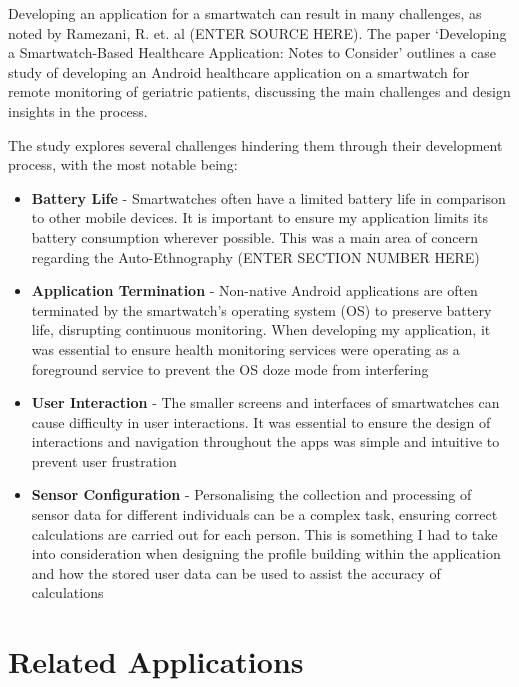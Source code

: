 \documentclass{l4proj}
\begin{document}
Developing an application for a smartwatch can result in many challenges, as noted by Ramezani, R. et. al (ENTER SOURCE HERE). The paper ‘Developing a Smartwatch-Based Healthcare Application: Notes to Consider’ outlines a case study of developing an Android healthcare application on a smartwatch for remote monitoring of geriatric patients, discussing the main challenges and design insights in the process.

The study explores several challenges hindering them through their development process, with the most notable being:

\begin{itemize}
    \item \textbf{Battery Life} - Smartwatches often have a limited battery life in comparison to other mobile devices. It is important to ensure my application limits its battery consumption wherever possible. This was a main area of concern regarding the Auto-Ethnography (ENTER SECTION NUMBER HERE)
    \item \textbf{Application Termination} - Non-native Android applications are often terminated by the smartwatch’s operating system (OS) to preserve battery life, disrupting continuous monitoring. When developing my application, it was essential to ensure health monitoring services were operating as a foreground service to prevent the OS doze mode from interfering
    \item \textbf{User Interaction} - The smaller screens and interfaces of smartwatches can cause difficulty in user interactions. It was essential to ensure the design of interactions and navigation throughout the apps was simple and intuitive to prevent user frustration
    \item \textbf{Sensor Configuration} - Personalising the collection and processing of sensor data for different individuals can be a complex task, ensuring correct calculations are carried out for each person. This is something I had to take into consideration when designing the profile building within the application and how the stored user data can be used to assist the accuracy of calculations
\end{itemize}


\section{Related Applications}



\end{document}

